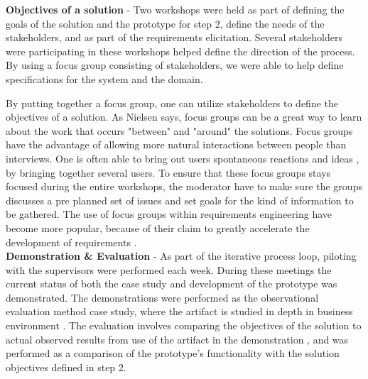 \textbf{Objectives of a solution} - Two workshops were held as part of defining the goals of the solution and the 
prototype for step 2, define the needs of the stakeholders, and as part of the 
requirements elicitation. Several stakeholders were participating in these
workshops helped define the direction of the process. By using a focus group 
consisting of stakeholders, we were able to help define specifications for the 
system and the domain. 


By putting together a focus group, one can utilize stakeholders to define the
objectives of a solution. As Nielsen \cite{FocusGroupstoStudyWorkPractice} 
says, focus groups can be a great way to learn about the work that occurs 
"between" and "around" the solutions. Focus groups have the advantage of allowing more natural interactions between people than interviews. One is often able to bring out users spontaneous reactions and ideas \cite{nielsen1997use}, 
by bringing together several users. To ensure that these focus groups stays 
focused during the entire workshops, the moderator have to make sure the 
groups discusses a pre planned set of issues and set goals for the kind of 
information to be gathered. The use of focus groups within requirements 
engineering have become more popular, because of their claim to greatly 
accelerate the development of requirements \cite{goguen1993techniques}. \\

\textbf{Demonstration \& Evaluation} - As part of the iterative process loop, piloting with the supervisors were performed each week. During these meetings the current status of both the case 
study and development of the prototype was demonstrated. The demonstrations 
were performed as the observational evaluation method case study, where the 
artifact is studied in depth in business environment \cite{von2004design}. The 
evaluation involves comparing the objectives of the solution to actual 
observed results from use of the artifact in the demonstration 
\cite{peffers2006design}, and was performed as a comparison of the prototype's 
functionality with the solution objectives defined in step 2. \\




